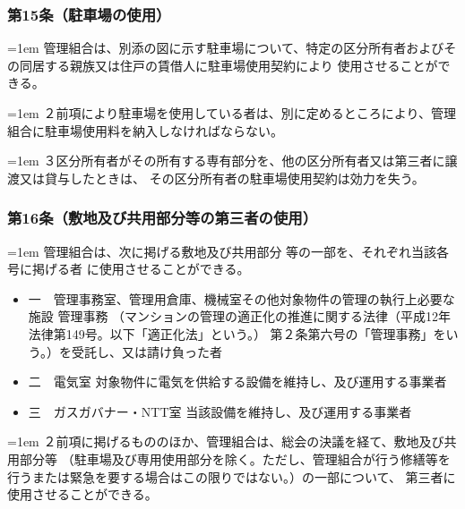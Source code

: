 \documentclass[
  twoside,
  luatex,
  paper=a4paper,
  fontsize=11pt,
  jafontsize=11pt,
  jlreq_notes,
]{jlreq}
\newcommand{\joumain}[1]{%
  \noindent\hangindent=1em\hangafter=1
  \hspace{1em}#1%
}
\newcommand{\kou}[2]{%
  \par\noindent\hangindent=1em\hangafter=1
  #1\hspace{1em}#2%
}
\begin{document}
  \subsubsection*{第15条（駐車場の使用）}
  \joumain{管理組合は、別添の図に示す駐車場について、特定の区分所有者およびその同居する親族又は住戸の賃借人に駐車場使用契約により
  使用させることができる。}
  \kou{２}{前項により駐車場を使用している者は、別に定めるところにより、管理組合に駐車場使用料を納入しなければならない。}
  \kou{３}{区分所有者がその所有する専有部分を、他の区分所有者又は第三者に譲渡又は貸与したときは、 その区分所有者の駐車場使用契約は効力を失う。}

  \subsubsection*{第16条（敷地及び共用部分等の第三者の使用）}
  \joumain{管理組合は、次に掲げる敷地及び共用部分 等の一部を、それぞれ当該各号に掲げる者 に使用させることができる。}
  \begin{itemize}[label={}, leftmargin=3em, itemindent=-2em]
    \item 一　管理事務室、管理用倉庫、機械室その他対象物件の管理の執行上必要な施設 管理事務
      （マンションの管理の適正化の推進に関する法律（平成12年法律第149号。以下「適正化法」という。）
      第２条第六号の「管理事務」をいう。）を受託し、又は請け負った者
    \item 二　電気室 対象物件に電気を供給する設備を維持し、及び運用する事業者
    \item 三　ガスガバナー・NTT室 当該設備を維持し、及び運用する事業者
  \end{itemize}
  \kou{２}{前項に掲げるもののほか、管理組合は、総会の決議を経て、敷地及び共用部分等
  （駐車場及び専用使用部分を除く。ただし、管理組合が行う修繕等を行うまたは緊急を要する場合はこの限りではない。）の一部について、
  第三者に使用させることができる。}
\end{document}
